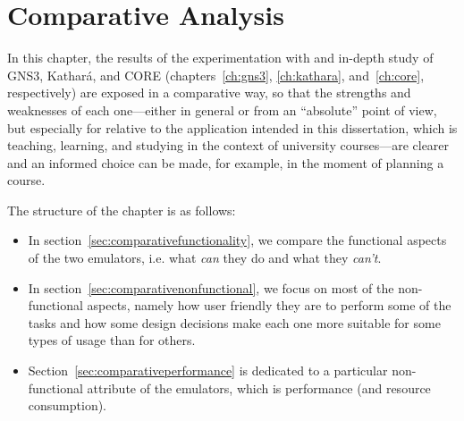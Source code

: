 
\chapter{Comparative Analysis}
\label{ch:comparative}

In this chapter, the results of the experimentation with and in-depth study of GNS3, Kathará, and CORE (chapters~\ref{ch:gns3}, \ref{ch:kathara}, and~\ref{ch:core}, respectively) are exposed in a comparative way, so that the strengths and weaknesses of each one---either in general or from an ``absolute'' point of view, but especially for relative to the application intended in this dissertation, which is teaching, learning, and studying in the context of university courses---are clearer and an informed choice can be made, for example, in the moment of planning a course.

The structure of the chapter is as follows:
\begin{itemize}
  \item In section~\ref{sec:comparativefunctionality}, we compare the functional aspects of the two emulators, i.e. what \emph{can} they do and what they \emph{can't}.
  \item In section~\ref{sec:comparativenonfunctional}, we focus on most of the non-functional aspects, namely how user friendly they are to perform some of the tasks and how some design decisions make each one more suitable for some types of usage than for others.
  \item Section~\ref{sec:comparativeperformance} is dedicated to a particular non-functional attribute of the emulators, which is performance (and resource consumption).
\end{itemize}







